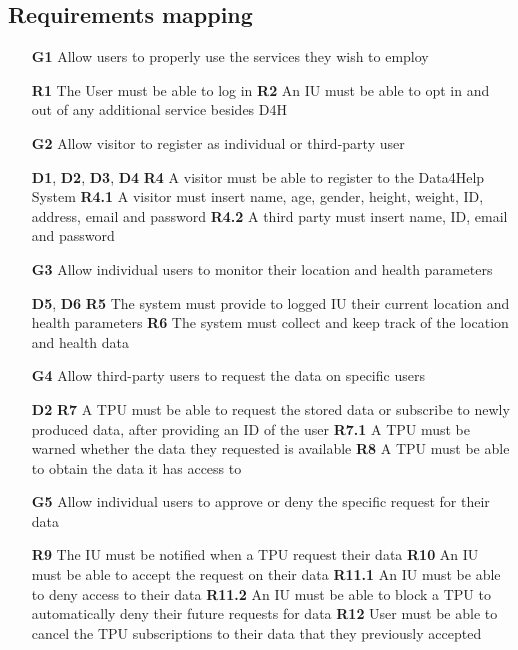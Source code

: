 \subsection{Requirements mapping}
\begin{itemize}
\item [\textbf{G1}] Allow users to properly use the services they wish to employ 

\subitem \textbf{R1} The User must be able to log in 
\subitem \textbf{R2} An IU must be able to opt in and out of any additional service besides D4H

\item [\textbf{G2}] Allow visitor to register as individual or third-party user 

\subitem \textbf{D1}, \textbf{D2}, \textbf{D3}, \textbf{D4}
\subitem \textbf{R4} A visitor must be able to register to the Data4Help System
\subitem \textbf{R4.1} A visitor must insert name, age, gender, height, weight, ID, address, email and password
\subitem \textbf{R4.2} A third party must insert name, ID, email and password 

\item [\textbf{G3}] Allow individual users to monitor their location and health parameters 

\subitem \textbf{D5}, \textbf{D6}
\subitem \textbf{R5} The system must provide to logged IU their current location and health parameters
\subitem \textbf{R6} The system must collect and keep track of the location and health data

\item [\textbf{G4}] Allow third-party users to request the data on specific users

\subitem \textbf{D2}
\subitem \textbf{R7} A TPU must be able to request the stored data or subscribe to newly produced data, after providing an ID of the user
\subitem \textbf{R7.1} A TPU must be warned whether the data they requested is available
\subitem \textbf{R8} A TPU must be able to obtain the data it has access to 

\item [\textbf{G5}] Allow individual users to approve or deny the specific request for their data

\subitem \textbf{R9} The IU must be notified when a TPU request their data
\subitem \textbf{R10} An IU must be able to accept the request on their data
\subitem \textbf{R11.1} An IU must be able to deny access to their data
\subitem \textbf{R11.2} An IU must be able to block a TPU to automatically deny their future requests for data
\subitem \textbf{R12} User must be able to cancel the TPU subscriptions to their data that they previously accepted


\end{itemize}
